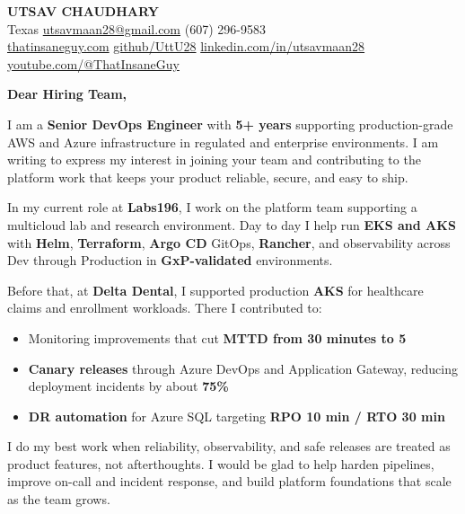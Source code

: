 \documentclass[10pt, letterpaper]{article}
\begin{document}
\begin{center}
    {\LARGE \textbf{UTSAV CHAUDHARY}}\\[4pt]
    \normalsize
    Texas \textbar{} \href{mailto:utsavmaan28@gmail.com}{utsavmaan28@gmail.com} \textbar{} (607) 296-9583\\
    \href{https://thatinsaneguy28.netlify.app/}{thatinsaneguy.com} \textbar{}
    \href{https://github.com/UttU28/}{github/UttU28} \textbar{}
    \href{https://www.linkedin.com/in/utsavmaan28}{linkedin.com/in/utsavmaan28} \textbar{}
    \href{https://www.youtube.com/@ThatInsaneGuy}{youtube.com/@ThatInsaneGuy}
\end{center}

\vspace{0.6cm}

\textbf{Dear Hiring Team,}

I am a \textbf{Senior DevOps Engineer} with \textbf{5+ years} supporting production-grade AWS and Azure infrastructure in regulated and enterprise environments. I am writing to express my interest in joining your team and contributing to the platform work that keeps your product reliable, secure, and easy to ship.

In my current role at \textbf{Labs196}, I work on the platform team supporting a multicloud lab and research environment. Day to day I help run \textbf{EKS and AKS} with \textbf{Helm}, \textbf{Terraform}, \textbf{Argo CD} GitOps, \textbf{Rancher}, and observability across Dev through Production in \textbf{GxP-validated} environments.

Before that, at \textbf{Delta Dental}, I supported production \textbf{AKS} for healthcare claims and enrollment workloads. There I contributed to:
\begin{itemize}
    \item Monitoring improvements that cut \textbf{MTTD from 30 minutes to 5}
    \item \textbf{Canary releases} through Azure DevOps and Application Gateway, reducing deployment incidents by about \textbf{75\%}
    \item \textbf{DR automation} for Azure SQL targeting \textbf{RPO 10 min / RTO 30 min}
\end{itemize}

I do my best work when reliability, observability, and safe releases are treated as product features, not afterthoughts. I would be glad to help harden pipelines, improve on-call and incident response, and build platform foundations that scale as the team grows.
\end{document}
